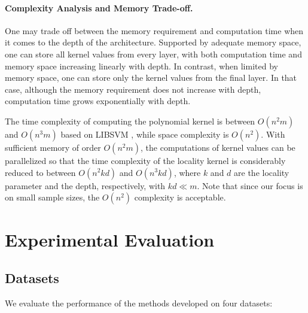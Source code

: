 \documentclass{article}
\theoremstyle{plain}
\theoremstyle{definition}
\theoremstyle{remark}
\begin{document}
\paragraph{Complexity Analysis and Memory Trade-off.}
One may trade off between the memory requirement and computation time when it comes to the depth of the architecture. Supported by adequate memory space, one can store all kernel values from every layer, with both computation time and memory space increasing linearly with depth. In contrast, when limited by memory space, one can store only the kernel values from the final layer. In that case, although the memory requirement does not increase with depth, computation time grows exponentially with depth.  

The time complexity of computing the polynomial kernel is between $O(n^2 m)$ and $O(n^3 m)$ based on LIBSVM \cite{chang2011libsvm}, while space complexity is $O(n^2)$. With sufficient memory of order $O(n^2 m)$, the computations of kernel values can be parallelized so that the time complexity of the locality kernel is considerably reduced to between $O(n^2 k d)$ and $O(n^3 k d)$, where $k$ and $d$ are the locality parameter and the depth, respectively, with $k d \ll m$. Note that since our focus is on small sample sizes, the $O(n^2)$ complexity is acceptable.



\section{Experimental Evaluation}
\label{Experimental Evaluation}
\subsection{Datasets}
We evaluate the performance of the methods developed on four datasets:
\end{document}

